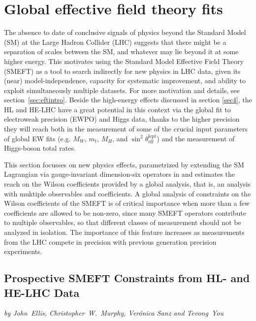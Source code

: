 \documentclass[../report.tex]{subfiles}
\begin{document}
\section{Global effective field theory fits \label{sec8:globalfit}}
\label{sec8}

The absence to date of conclusive signals of physics beyond the Standard Model (SM) at the Large Hadron Collider (LHC) suggests
that there might be a separation of scales between the SM, and whatever may lie beyond it at some higher energy.
This motivates using the Standard Model Effective Field Theory (SMEFT) as a tool to search indirectly for new physics in LHC data,
given its (near) model-independence, capacity for systematic improvement, and ability to exploit simultaneously multiple datasets. For more motivation and details, see section~\ref{sec:eftintro}.
Beside the high-energy effects discussed in section \ref{sec4}, the HL and HE-LHC have a great potential in this context via the global fit to electroweak precision (EWPO) and Higgs
data, thanks to the higher precision they will reach both in the
measurement of some of the crucial input parameters of global EW fits
(e.g. $M_W$, $m_t$, $M_H$, and
$\sin^2\theta_{\mathrm{eff}}^{\mathrm{lept}}$) and the measurement
of Higgs-boson total rates.




This section focusses  on new physics effects, parametrized by extending
the SM Lagrangian via gauge-invariant dimension-six operators in  and estimates the reach on the Wilson coefficients provided by a global analysis, that is, an analysis with muktiple observables and coefficients.
A global analysis of constraints on the Wilson coefficients of the SMEFT is of critical importance when more than a few coefficients are allowed to be non-zero,
since many SMEFT operators contribute to multiple observables, so that different classes of measurement should not be analyzed in isolation.
The importance of this feature increases as
measurements from the LHC compete in precision with previous generation precision experiments.





\subsection{Prospective SMEFT Constraints from HL- and HE-LHC Data %
}

\begin{center}
{\it by     John~Ellis,
Christopher~W.~Murphy,
Ver\'onica Sanz and
Tevong~You}
\end{center}
\end{document}
